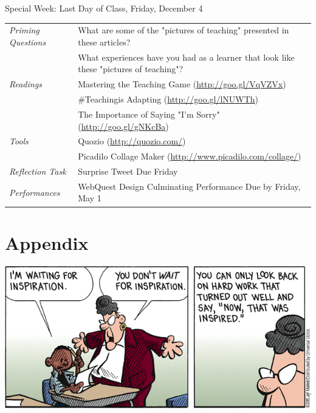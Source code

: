 \documentclass{tufte-handout}
\newcommand{\tabpq}{\faQuestionSign\medspace\textit{Priming Questions}}
\newcommand{\tabread}{\faBook\medspace\textit{Readings}}
\newcommand{\tabtools}{\faWrench\medspace\textit{Tools}}
\newcommand{\tabtweet}{\faLightbulb\medspace\textit{Reflection Task} & Surprise Tweet Due Friday \\}
\newcommand{\tabperformance}{\faTasks\medspace\textit{Performances}}
\newenvironment{tabsched}
	{\small
	\begin{tabular}{p{1.5in}p{5in}}
	\toprule}
	{\bottomrule
	\end{tabular}
	\normalsize}
\newenvironment{specweek}
	{\begin{center}
		\fontseries{b} \faBullhorn \medspace Special Week: }
		{\medspace \faBullhorn \fontseries{m}
	\end{center}}
\newcommand{\finisemester}{Last Day of Class, Friday, December 4}
\begin{document}
\begin{fullwidth}
\begin{specweek}\finisemester\end{specweek}

\begin{tabsched}
	\tabpq & What are some of the "pictures of teaching" presented in these articles? \\
	& What experiences have you had as a learner that look like these "pictures of teaching"? \\
	\midrule
	\tabread & Mastering the Teaching Game (\url{http://goo.gl/VqVZVx}) \\
	& \#Teachingis Adapting (\url{http://goo.gl/lNUWTh}) \\
	& The Importance of Saying "I'm Sorry" (\url{http://goo.gl/gNKcBa}) \\
	\midrule
	\tabtools & Quozio (\url{http://quozio.com/}) \\
	& Picadilo Collage Maker (\url{http://www.picadilo.com/collage/}) \\
	\midrule
	\tabtweet
	\midrule
	\tabperformance & WebQuest Design Culminating Performance Due by Friday, May 1 \\
\end{tabsched}

\end{fullwidth}

\newpage



\newpage

\part{Appendix}
\begin{marginfigure}%
	\begin{center}
  \includegraphics[width=1\linewidth]{frazz-inspiration.png}
  \label{fig:ap-pic}
	\end{center}
\end{marginfigure}
\end{document}
